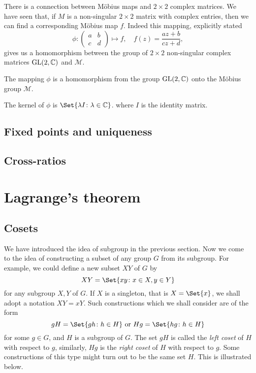 \documentclass[main.tex]{subfiles}
\begin{document}
		There is a connection between M\"obius maps and $2 \times 2$ complex matrices. We have seen that, if $M$ is a non-singular $2 \times 2$ matrix with complex entries, then we can find a corresponding M\"obius map $f$. Indeed this mapping, explicitly stated
		\begin{equation*}
			\phi\colon 
			\begin{pmatrix}
			a	&	b 	\\
			c	&	d	
			\end{pmatrix}
			\mapsto f, \quad f(z) = \frac{az + b}{cz + d},
		\end{equation*}
		gives us a homomorphism between the group of $2 \times 2$ non-singular complex matrices $\mathrm{GL}(2, \mathbb C)$ and $\mathcal{M}$.
		\begin{theorem}
			The mapping $\phi$ is a homomorphism from the group $\mathrm{GL}(2, \mathbb C)$ onto the M\"obius group $\mathcal{M}$.
		\end{theorem}
		\begin{lemma}
			The kernel of $\phi$ is $\Set{\lambda I \colon \lambda \in \CC}$. where $I$ is the identity matrix.
		\end{lemma}
		
		\subsection{Fixed points and uniqueness}
			
		\subsection{Cross-ratios}
			
		\section{Lagrange's theorem}
			\subsection{Cosets}
				We have introduced the idea of subgroup in the previous section. Now we come to the idea of constructing a subset of any group $G$ from its subgroup. For example, we could define a new subset $XY$ of $G$ by
				\begin{equation*}
					XY = \Set{xy \colon x \in X, y\in Y}
				\end{equation*}
				for any subgroup $X, Y$ of $G$. If $X$ is a singleton, that is $X = \Set{x}$, we shall adopt a notation $XY = xY$. Such constructions which we shall consider are of the form
				\begin{equation*}
					gH = \Set{gh \colon h\in H} \text{ or } Hg = \Set{hg \colon h \in H}
				\end{equation*}
				for some $g \in G$, and $H$ is a subgroup of $G$. The set $gH$ is called the \textit{left coset} of $H$ with respect to $g$, similarly, $Hg$ is the \textit{right coset} of $H$ with respect to $g$. Some constructions of this type might turn out to be the same set $H$. This is illustrated below.
				
\end{document}
